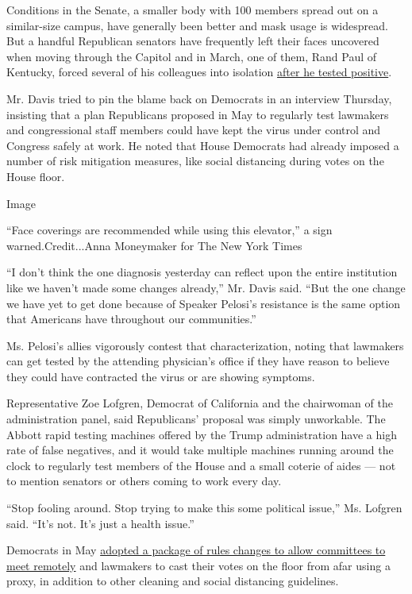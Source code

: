 Conditions in the Senate, a smaller body with 100 members spread out on
a similar-size campus, have generally been better and mask usage is
widespread. But a handful Republican senators have frequently left their
faces uncovered when moving through the Capitol and in March, one of
them, Rand Paul of Kentucky, forced several of his colleagues into
isolation
\href{https://www.nytimes.com/2020/03/22/us/politics/coronavirus-rand-paul.html}{after
he tested positive}.

Mr. Davis tried to pin the blame back on Democrats in an interview
Thursday, insisting that a plan Republicans proposed in May to regularly
test lawmakers and congressional staff members could have kept the virus
under control and Congress safely at work. He noted that House Democrats
had already imposed a number of risk mitigation measures, like social
distancing during votes on the House floor.

Image

``Face coverings are recommended while using this elevator,'' a sign
warned.Credit...Anna Moneymaker for The New York Times

``I don't think the one diagnosis yesterday can reflect upon the entire
institution like we haven't made some changes already,'' Mr. Davis said.
``But the one change we have yet to get done because of Speaker Pelosi's
resistance is the same option that Americans have throughout our
communities.''

Ms. Pelosi's allies vigorously contest that characterization, noting
that lawmakers can get tested by the attending physician's office if
they have reason to believe they could have contracted the virus or are
showing symptoms.

Representative Zoe Lofgren, Democrat of California and the chairwoman of
the administration panel, said Republicans' proposal was simply
unworkable. The Abbott rapid testing machines offered by the Trump
administration have a high rate of false negatives, and it would take
multiple machines running around the clock to regularly test members of
the House and a small coterie of aides --- not to mention senators or
others coming to work every day.

``Stop fooling around. Stop trying to make this some political issue,''
Ms. Lofgren said. ``It's not. It's just a health issue.''

Democrats in May
\href{https://www.nytimes.com/2020/05/15/us/politics/remote-voting-house-coronavirus.html}{adopted
a package of rules changes to allow committees to meet remotely} and
lawmakers to cast their votes on the floor from afar using a proxy, in
addition to other cleaning and social distancing guidelines.


